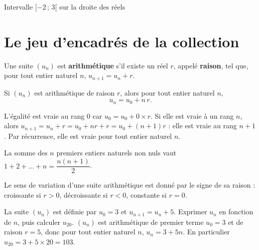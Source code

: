 \documentclass{gabarits/nexus-manuel-v5}
\begin{document}
\begin{nxfigure}{Intervalle $[-2\,;\,3[$ sur la droite des réels}
  \figIntervalle{-4}{5}{-2}{3}{[}{[}{$-2 \leqslant x < 3$}
\end{nxfigure}

\clearpage
\section{Le jeu d'encadrés de la collection}

\begin{definitionV}
Une suite $(u_n)$ est \textbf{arithmétique} s'il existe un réel $r$, appelé
\textbf{raison}, tel que, pour tout entier naturel $n$,
$u_{n+1} = u_n + r$.
\end{definitionV}

\begin{theoremeV}
Si $(u_n)$ est arithmétique de raison $r$, alors pour tout entier naturel
$n$, \[ u_n = u_0 + n\,r. \]
\end{theoremeV}

\begin{demonstrationV}
L'égalité est vraie au rang $0$ car $u_0 = u_0 + 0 \times r$. Si elle est
vraie à un rang $n$, alors $u_{n+1} = u_n + r = u_0 + n r + r
= u_0 + (n+1) r$ : elle est vraie au rang $n+1$. Par récurrence, elle est
vraie pour tout entier naturel $n$.
\end{demonstrationV}

\begin{proprieteV}
La somme des $n$ premiers entiers naturels non nuls vaut
$1 + 2 + \dots + n = \dfrac{n(n+1)}{2}$.
\end{proprieteV}

\begin{remarqueV}
Le sens de variation d'une suite arithmétique est donné par le signe de sa
raison : croissante si $r > 0$, décroissante si $r < 0$, constante si
$r = 0$.
\end{remarqueV}

\begin{exempleresoluV}
La suite $(u_n)$ est définie par $u_0 = 3$ et $u_{n+1} = u_n + 5$.
Exprimer $u_n$ en fonction de $n$, puis calculer $u_{20}$.
\tcblower
$(u_n)$ est arithmétique de premier terme $u_0 = 3$ et de raison $r = 5$,
donc pour tout entier naturel $n$, $u_n = 3 + 5n$.
En particulier $u_{20} = 3 + 5 \times 20 = 103$.
\end{exempleresoluV}
\end{document}
